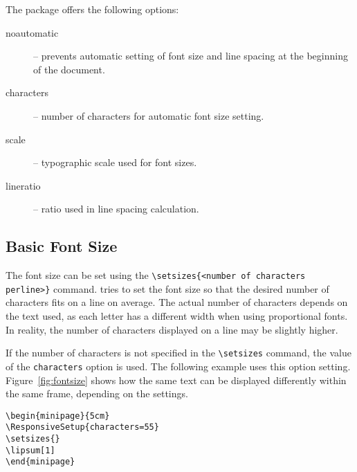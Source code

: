 \documentclass{ltugboat}
\begin{document}
The  package offers the following options:

\begin{description}
  \item[noautomatic] – prevents automatic setting of font size and line spacing at the beginning of the document.
  \item[characters] – number of characters for automatic font size setting.
  \item[scale] – typographic scale used for font sizes.
  \item[lineratio] – ratio used in line spacing calculation.
\end{description}

\subsection{Basic Font Size}

The font size can be set using the \verb|\setsizes{<number of characters per|\allowbreak\verb|line>}| command.  tries to set the font size so that the desired number of characters fits on a line on average. The actual number of characters depends on the text used, as each letter has a different width when using proportional fonts. In reality, the number of characters displayed on a line may be slightly higher.

If the number of characters is not specified in the \verb|\setsizes| command, the value of the \texttt{characters} option is used. The following example uses this option setting. Figure~\ref{fig:fontsize} shows how the same text can be displayed differently within the same frame, depending on the settings.

\begin{verbatim}
\begin{minipage}{5cm}
\ResponsiveSetup{characters=55}
\setsizes{}
\lipsum[1]
\end{minipage}
\end{verbatim}
\end{document}
